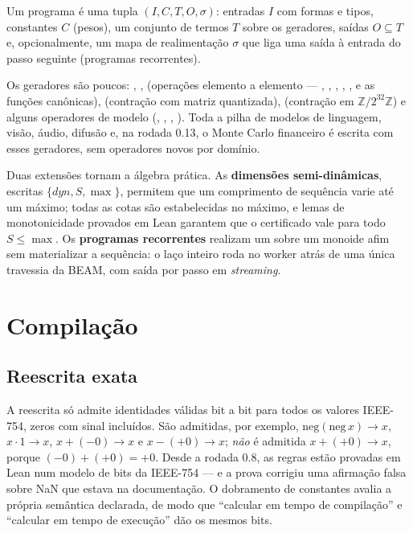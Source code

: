 \begin{definicao}[Programa]
Um programa é uma tupla $(I, C, T, O, \sigma)$: entradas $I$ com formas e tipos, constantes $C$ (pesos), um conjunto de termos $T$ sobre os geradores, saídas $O \subseteq T$ e, opcionalmente, um mapa de realimentação $\sigma$ que liga uma saída à entrada do passo seguinte (programas recorrentes).
\end{definicao}

Os geradores são poucos: , ,  (operações elemento a elemento --- , , , , ,  e as funções canônicas),  (contração com matriz quantizada),  (contração em $\mathbb{Z}/2^{32}\mathbb{Z}$) e alguns operadores de modelo (, , , ). Toda a pilha de modelos de linguagem, visão, áudio, difusão e, na rodada 0.13, o Monte Carlo financeiro é escrita com esses geradores, sem operadores novos por domínio.

Duas extensões tornam a álgebra prática. As \textbf{dimensões semi-dinâmicas}, escritas $\{\mathit{dyn}, S, \max\}$, permitem que um comprimento de sequência varie até um máximo; todas as cotas são estabelecidas no máximo, e lemas de monotonicidade provados em Lean garantem que o certificado vale para todo $S \leq \max$. Os \textbf{programas recorrentes} realizam um  sobre um monoide afim sem materializar a sequência: o laço inteiro roda no worker atrás de uma única travessia da BEAM, com saída por passo em \textit{streaming}.

\section{Compilação}\label{sec:arq-compilacao}

\subsection{Reescrita exata}

A reescrita só admite identidades válidas bit a bit para todos os valores IEEE-754, zeros com sinal incluídos. São admitidas, por exemplo, $\mathrm{neg}(\mathrm{neg}\,x) \to x$, $x \cdot 1 \to x$, $x + (-0) \to x$ e $x - (+0) \to x$; \emph{não} é admitida $x + (+0) \to x$, porque $(-0) + (+0) = +0$. Desde a rodada 0.8, as regras estão provadas em Lean num modelo de bits da IEEE-754 --- e a prova corrigiu uma afirmação falsa sobre NaN que estava na documentação. O dobramento de constantes avalia a própria semântica declarada, de modo que ``calcular em tempo de compilação'' e ``calcular em tempo de execução'' dão os mesmos bits.

